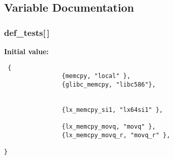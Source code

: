 \subsection{Variable Documentation}
\subsubsection{ {\bf def\_\-tests}[$\,$]}\label{memcpy_2def__test_8h_a4}


{\bf Initial value:}

\footnotesize\begin{verbatim} {
                {memcpy, "local" },
                {glibc_memcpy, "libc586"},
                
                
                {lx_memcpy_si1, "lx64si1" },
                
                {lx_memcpy_movq, "movq" },
                {lx_memcpy_movq_r, "movq_r" },
                
}
\end{verbatim}\normalsize 
